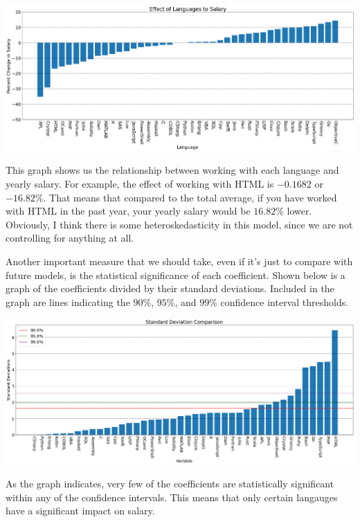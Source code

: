 \documentclass{report}
\begin{document}
\vspace{0.5in}

\includegraphics[width=0.9\linewidth]{model1coefficientlangauges.png}

\vspace{0.5in}

This graph shows us the relationship between working with each language and yearly salary. For example, the effect of working with HTML is $-0.1682$ or $-16.82\%$. That means that compared to the total average, if you have worked with HTML in the past year, your yearly salary would be $16.82\%$ lower. Obviously, I think there is some heteroskedasticity in this model, since we are not controlling for anything at all.

Another important measure that we should take, even if it's just to compare with future models, is the statistical significance of each coefficient. Shown below is a graph of the coefficients divided by their standard deviations. Included in the graph are lines indicating the $90\%$, $95\%$, and $99\%$ confidence interval thresholds.

\vspace{0.5in}

\includegraphics[width=0.9\linewidth]{model1confidencelanguages.png}

\vspace{0.5in}

As the graph indicates, very few of the coefficients are statistically significant within any of the confidence intervals. This means that only certain langauges have a significant impact on salary.
\end{document}
